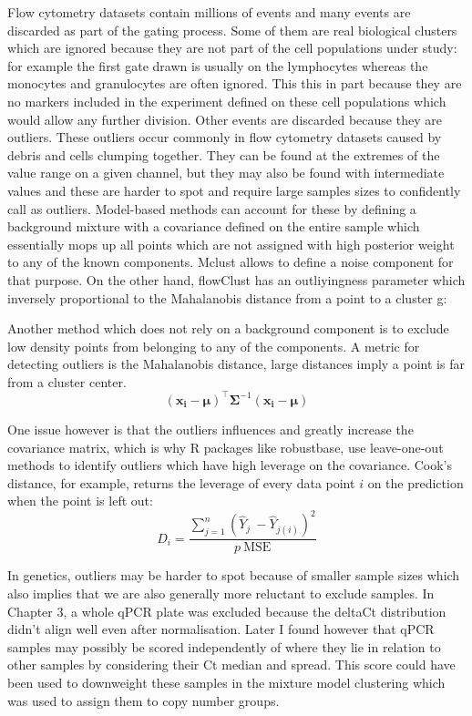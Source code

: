 Flow cytometry datasets contain millions of events and many events are discarded as part of the gating process.
Some of them are real biological clusters which are ignored because they are not part of the cell populations under study:
for example the first gate drawn is usually on the lymphocytes whereas the monocytes and granulocytes are often ignored.
This this in part because they are no markers included in the experiment defined on these cell populations which would allow any further division.
Other events are discarded because they are outliers. These outliers occur commonly in flow cytometry datasets caused by debris and cells clumping together.
They can be found at the extremes of the value range on a given channel, but they may also be found with intermediate values and these are harder to spot and require large samples sizes to confidently call as outliers.
Model-based methods can account for these by defining a background mixture with a covariance defined on the entire sample which essentially mops up all points
which are not assigned with high posterior weight to any of the known components.
Mclust allows to define a noise component for that purpose.
On the other hand, flowClust  has an outliyingness parameter which inversely proportional to the Mahalanobis distance from a point to a cluster g:


Another method which does not rely on a background component is to exclude low density points from belonging to any of the components.
A metric for detecting outliers is the Mahalanobis distance, large distances imply a point is far from a cluster center.
\[
(\boldsymbol{x_i}-\boldsymbol{\mu})^{\top}\boldsymbol{\Sigma}^{-1}(\boldsymbol{x_i}-\boldsymbol{\mu})
\]


One issue however is that the outliers influences and greatly increase the covariance matrix, which is why R packages like robustbase,
use leave-one-out methods to identify outliers which have high leverage on the covariance.
Cook's distance, for example, returns the leverage of every data point $i$  on the prediction when the point is left out:
\[
D_i = \frac{ \sum_{j=1}^n (\hat Y_j\ - \hat Y_{j(i)})^2 }{p \ \mathrm{MSE}}
\]

In genetics, outliers may be harder to spot because of smaller sample sizes which also implies that we are also generally more reluctant to exclude samples.
In Chapter 3, a whole qPCR plate was excluded because the deltaCt distribution didn’t align well even after normalisation.
Later I found however that qPCR samples may possibly be scored independently of where they lie in relation to other samples by considering their Ct median and spread.
This score could have been used to downweight these samples in the mixture model clustering which was used to assign them to copy number groups.

